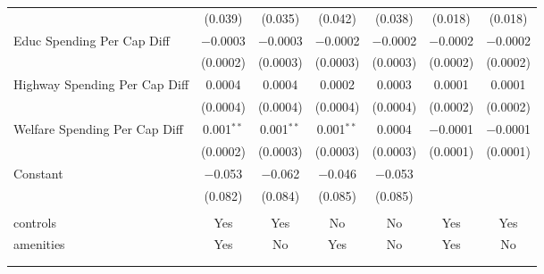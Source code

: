 \begin{table}[!htbp]
\begin{tabular}{@{\extracolsep{5pt}}lcccccc}
  & (0.039) & (0.035) & (0.042) & (0.038) & (0.018) & (0.018) \\ 
  Educ Spending Per Cap Diff & $-$0.0003 & $-$0.0003 & $-$0.0002 & $-$0.0002 & $-$0.0002 & $-$0.0002 \\ 
  & (0.0002) & (0.0003) & (0.0003) & (0.0003) & (0.0002) & (0.0002) \\ 
  Highway Spending Per Cap Diff & 0.0004 & 0.0004 & 0.0002 & 0.0003 & 0.0001 & 0.0001 \\ 
  & (0.0004) & (0.0004) & (0.0004) & (0.0004) & (0.0002) & (0.0002) \\ 
  Welfare Spending Per Cap Diff & 0.001$^{**}$ & 0.001$^{**}$ & 0.001$^{**}$ & 0.0004 & $-$0.0001 & $-$0.0001 \\ 
  & (0.0002) & (0.0003) & (0.0003) & (0.0003) & (0.0001) & (0.0001) \\ 
  Constant & $-$0.053 & $-$0.062 & $-$0.046 & $-$0.053 &  &  \\ 
  & (0.082) & (0.084) & (0.085) & (0.085) &  &  \\ 
 \hline \\[-1.8ex] 
controls & Yes & Yes & No & No & Yes & Yes \\ 
amenities & Yes & No & Yes & No & Yes & No \\ 
\hline \\[-1.8ex] 
\hline 
\hline \\[-1.8ex] 
\end{tabular} 
\end{table} 
